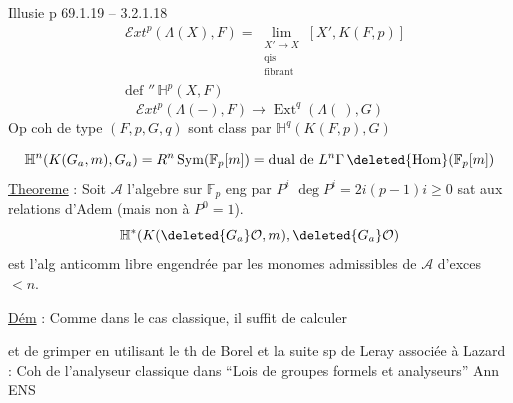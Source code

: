 Illusie p 69.1.19 -- 3.2.1.18
\[
\begin{aligned}
&\mathcal E xt^{p}(\Lambda(X),F)=\lim_{\substack{X'\to X\\\mathrm{qis}\\\text{fibrant}}}[X',K(F,p)]\\
&\text{def }''\, \mathbb H^p(X,F)
\end{aligned}
\]
\[
\mathcal E xt^p(\Lambda(-),F)\longrightarrow\operatorname{Ext}^q(\Lambda(\ ),G)
\]
Op coh de type $(F,p,G,q)$ sont class par $\mathbb H^q(K(F,p),G)$

\[
\mathbb H^n(K(G_a,m),G_a)=R^n\operatorname{Sym}(\mathbb F_p[m])
=\text{dual de }L^n\Gamma\,\deleted{\mathrm{Hom}}(\mathbb F_p[m])
\]
\uline{Theoreme} : Soit $\mathscr A$ l'algebre sur $\mathbb F_p$ eng par $P^i$\qquad
$\deg P^i=2i(p-1)$\qquad $i\geq0$ sat aux relations d'Adem (mais non à $P^0=1$).
\[
\mathbb H^*(K(\deleted{G_a}\mathcal O,m),\deleted{G_a}\mathcal O)
\]
est l'alg anticomm libre engendrée par les monomes admissibles de $\mathscr A$ d'exces $<n$.

\uline{Dém} : Comme dans le cas classique, il suffit de calculer  et de grimper en utilisant le th de Borel et la suite sp de Leray associée à
 Lazard : Coh de l'analyseur classique dans ``Lois de groupes formels et analyseurs'' Ann ENS

